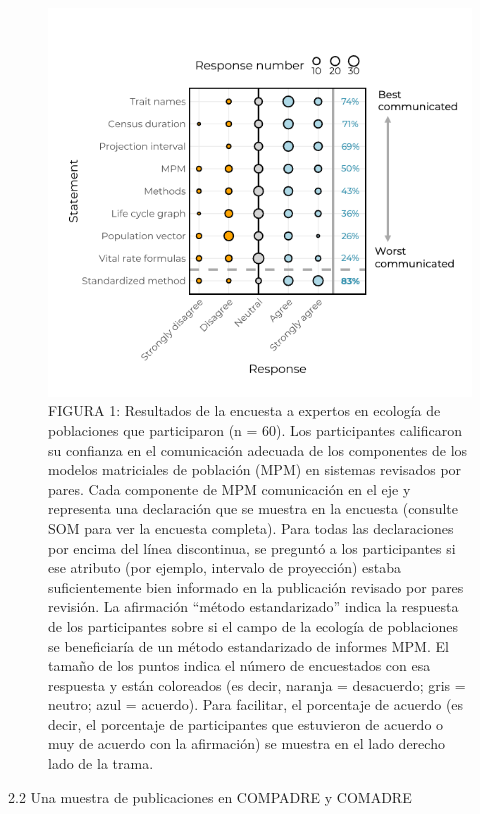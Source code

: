\documentclass[
]{book}
\theoremstyle{definition}
\theoremstyle{definition}
\theoremstyle{definition}
\theoremstyle{definition}
\theoremstyle{remark}
\begin{document}
\begin{figure}
\centering
\includegraphics{Figures/Survey_paper.png}
\caption{FIGURA 1: Resultados de la encuesta a expertos en ecología de poblaciones que participaron (n = 60). Los participantes calificaron su confianza en el comunicación adecuada de los componentes de los modelos matriciales de población (MPM) en sistemas revisados por pares. Cada componente de MPM comunicación en el eje y representa una declaración que se muestra en la encuesta (consulte SOM para ver la encuesta completa). Para todas las declaraciones por encima del línea discontinua, se preguntó a los participantes si ese atributo (por ejemplo, intervalo de proyección) estaba suficientemente bien informado en la publicación revisado por pares revisión. La afirmación ``método estandarizado'' indica la respuesta de los participantes sobre si el campo de la ecología de poblaciones se beneficiaría de un método estandarizado de informes MPM. El tamaño de los puntos indica el número de encuestados con esa respuesta y están coloreados (es decir, naranja = desacuerdo; gris = neutro; azul = acuerdo). Para facilitar, el porcentaje de acuerdo (es decir, el porcentaje de participantes que estuvieron de acuerdo o muy de acuerdo con la afirmación) se muestra en el lado derecho lado de la trama.}
\end{figure}

2.2 \textbar{} Una muestra de publicaciones en COMPADRE y COMADRE
\end{document}
